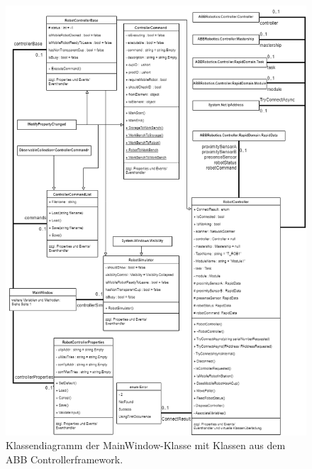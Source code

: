     \begin{figure}[h]
        \label{fig:figure3}
        \includegraphics[width = \textwidth ]{Bilder/LV_Klassendiagramm_ABBController}
        \caption[Klassendiagramm ABB Controller ]%
        {\small Klassendiagramm der MainWindow-Klasse mit Klassen aus dem ABB Controllerframework. }
        \centering
    \end{figure}

